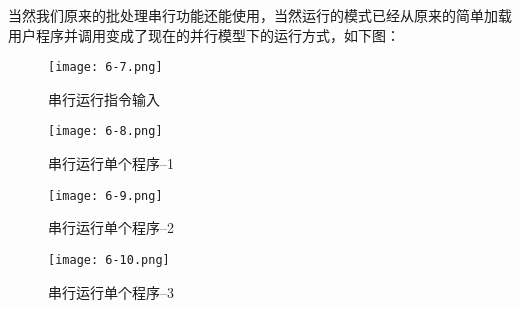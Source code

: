 \documentclass[UTF8]{article}
\begin{document}
\begin{enumerate}[1)]
\par 当然我们原来的批处理串行功能还能使用，当然运行的模式已经从原来的简单加载用户程序并调用变成了现在的并行模型下的运行方式，如下图：
\begin{figure}[htbp]
			\begin{minipage}[t]{0.5\linewidth}
			\centering
			\texttt{[image: 6-7.png]}
			\caption{串行运行指令输入}
			\end{minipage}
			\begin{minipage}[t]{0.5\linewidth}
				\centering
			\texttt{[image: 6-8.png]}
			\caption{串行运行单个程序--1}
			\end{minipage}
		\end{figure}
\begin{figure}[htbp]
			\begin{minipage}[t]{0.5\linewidth}
			\centering
			\texttt{[image: 6-9.png]}
			\caption{串行运行单个程序--2}
			\end{minipage}
			\begin{minipage}[t]{0.5\linewidth}
				\centering
			\texttt{[image: 6-10.png]}
			\caption{串行运行单个程序--3}
			\end{minipage}
		\end{figure}
\end{enumerate}
\end{document}
